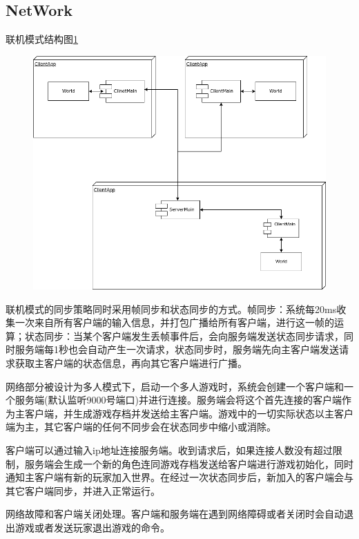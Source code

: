 \documentclass{SCIS2022cn}
\begin{document}
\subsection{NetWork}
联机模式结构图\ref{jw-network.drawio}\par
	\begin{figure}
		\centering
		\includegraphics[width=1.0\textwidth]{img/jw-network.drawio.png}
		\label{jw-network.drawio}
	\end{figure}
联机模式的同步策略同时采用帧同步和状态同步的方式。帧同步：系统每20ms收集一次来自所有客户端的输入信息，并打包广播给所有客户端，进行这一帧的运算；状态同步：当某个客户端发生丢帧事件后，会向服务端发送状态同步请求，同时服务端每1秒也会自动产生一次请求，状态同步时，服务端先向主客户端发送请求获取主客户端的状态信息，再向其它客户端进行广播。\par
网络部分被设计为多人模式下，启动一个多人游戏时，系统会创建一个客户端和一个服务端(默认监听9000号端口)并进行连接。服务端会将这个首先连接的客户端作为主客户端，并生成游戏存档并发送给主客户端。游戏中的一切实际状态以主客户端为主，其它客户端的任何不同步会在状态同步中缩小或消除。\par 
客户端可以通过输入ip地址连接服务端。收到请求后，如果连接人数没有超过限制，服务端会生成一个新的角色连同游戏存档发送给客户端进行游戏初始化，同时通知主客户端有新的玩家加入世界。在经过一次状态同步后，新加入的客户端会与其它客户端同步，并进入正常运行。\par
网络故障和客户端关闭处理。客户端和服务端在遇到网络障碍或者关闭时会自动退出游戏或者发送玩家退出游戏的命令。
\end{document}
